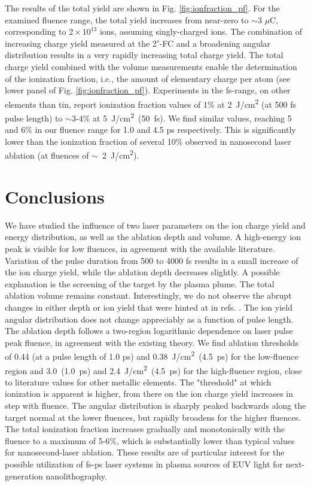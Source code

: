 \documentclass[aip, jap, reprint, amsmath, amssymb]{revtex4-1}
\begin{document}
The results of the total yield are shown in Fig. \ref{fig:ionfraction_pf}. For the examined fluence range, the total yield increases from near-zero to $\sim$3 $\mu$C, corresponding to $2 \times 10^{13}$ ions, assuming singly-charged ions. The combination of increasing charge yield measured at the 2\textsuperscript{$\circ$}-FC and a broadening angular distribution results in a very rapidly increasing total charge yield. The total charge yield combined with the volume measurements enable the determination of the ionization fraction, i.e., the amount of elementary charge per atom (see lower panel of Fig. \ref{fig:ionfraction_pf}). Experiments in the fs-range, on other elements than tin, report ionization fraction values of 1\%\cite{toftmann2013} at \mbox{2 J/cm\textsuperscript{2}} (at 500 fs pulse length) to \mbox{$\sim$3-4\%\cite{ni2014}} at \mbox{5 J/cm\textsuperscript{2} (50 fs)}. We find similar values, reaching 5 and 6\% in our fluence range for 1.0 and 4.5 ps respectively. This is significantly lower than the ionization fraction of several 10\% observed in nanosecond laser ablation (at fluences of \mbox{$\sim$ 2 J/cm\textsuperscript{2})\cite{thestrup2002, doggett2011}}.


\section{\label{sec:conclusions}Conclusions}

We have studied the influence of two laser parameters on the ion charge yield and energy distribution, as well as the ablation depth and volume. A high-energy ion peak is visible for low fluences, in agreement with the available literature. Variation of the pulse duration from 500 to 4000 fs results in a small increase of the ion charge yield, while the ablation depth decreases slightly. A possible explanation is the screening of the target by the plasma plume. The total ablation volume remains constant. Interestingly, we do not observe the abrupt changes in either depth or ion yield that were hinted at in refs. . The ion yield angular distribution does not change appreciably as a function of pulse length. The ablation depth follows a two-region logarithmic dependence on laser pulse peak fluence, in agreement with the existing theory. We find ablation thresholds of 0.44 (at a pulse length of 1.0 ps) and \mbox{0.38 J/cm\textsuperscript{2} (4.5 ps)} for the low-fluence region and \mbox{3.0 (1.0 ps)} and \mbox{2.4 J/cm\textsuperscript{2} (4.5 ps)} for the high-fluence region, close to literature values for other metallic elements. The "threshold" at which ionization is apparent is higher, from there on the ion charge yield increases in step with fluence. The angular distribution is sharply peaked backwards along the target normal at the lower fluences, but rapidly broadens for the higher fluences. The total ionization fraction increases gradually and monotonically with the fluence to a maximum of 5-6\%, which is substantially lower than typical values for nanosecond-laser ablation. These results are of particular interest for the possible utilization of fs-ps laser systems in plasma sources of EUV light for next-generation nanolithography.
\end{document}
